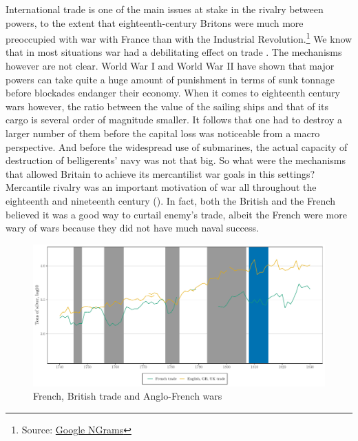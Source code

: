 \documentclass[12pt,a4paper,notitlepage,english]{article}
\newcommand{\source}[1]{\caption*{\footnotesize Source: {#1}} }
\begin{document}
International trade is one of the main issues at stake in the rivalry between powers, to the extent that eighteenth-century Britons were much more preoccupied with war with France than with the Industrial Revolution.\footnote{Source: \href{https://books.google.com/ngrams}{Google NGrams}}
We know that in most situations war had a debilitating effect on trade \citep{karlsson2021war}. The mechanisms however are not clear.
World War I and World War II have shown that major powers can take quite a huge amount of punishment in terms of sunk tonnage before blockades endanger their economy. When it comes to eighteenth century wars however, the ratio between the value of the sailing ships and that of its cargo is several order of magnitude smaller. It follows that one had to destroy a larger number of them before the capital loss was noticeable from a macro perspective.  
And before the widespread use of submarines, the actual capacity of destruction of belligerents’ navy was not that big.
So what were the mechanisms that allowed Britain to achieve its mercantilist war goals in this settings?
Mercantile rivalry was an important motivation of war all throughout the eighteenth and nineteenth century (\citet{wallerstein_modern_1980, crouzet_guerre_2008}). In fact, both the British and the French believed it was a good way to curtail enemy's trade, albeit the French were more wary of wars because they did not have much naval success.\\
\begin{figure}
\caption{French, British trade and Anglo-French wars}
\centering
\label{FrBritTrade}
\includegraphics[scale = .6]{Total_silver_trade_FR_GB.pdf}
\end{figure}
\end{document}
